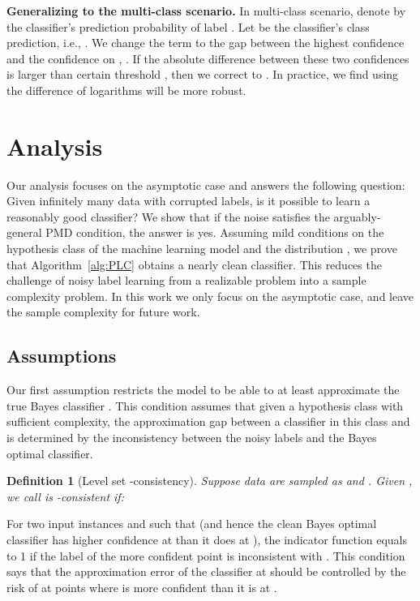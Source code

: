 \documentclass{article} \usepackage{iclr2021_conference,times}
\newtheorem{definition}{Definition}
\newcommand{\myparagraph}[1]{\textbf{#1}}
\begin{document}
\myparagraph{Generalizing to the multi-class scenario.} In multi-class scenario, denote by  the classifier's prediction probability of label . Let  be the classifier's class prediction, i.e., . 
We change the  term to the gap between the highest confidence  and the confidence on , . If the absolute difference between these two confidences is larger than certain threshold , then we correct  to . In practice, we find using the difference of logarithms will be more robust.

\section{Analysis}
\label{sec:theory}
\vspace{-0.5em}

Our analysis focuses on the asymptotic case and answers the following question: Given infinitely many data with corrupted labels, is it possible to learn a reasonably good classifier? We show that if the noise satisfies the arguably-general PMD condition, the answer is yes. Assuming mild conditions on the hypothesis class of the machine learning model and the distribution , we prove that Algorithm~\ref{alg:PLC} obtains a nearly clean classifier. This reduces the challenge of noisy label learning from a realizable problem into a sample complexity problem. In this work we only focus on the asymptotic case, and leave the sample complexity for future work.

\subsection{Assumptions}
\vspace{-0.5em}

Our first assumption restricts the model to be able to at least approximate the true Bayes classifier . This condition assumes that given a hypothesis class  with sufficient complexity, the approximation gap between a classifier  in this class and  is determined by the inconsistency between the noisy labels and the Bayes optimal classifier. 

\begin{definition} [Level set -consistency] \label{levelset_consist}
Suppose data are sampled as   and . Given , we call  is -consistent if:

\end{definition}

For two input instances  and  such that  (and hence the clean Bayes optimal classifier  has higher confidence at  than it does at ), the indicator function  equals to 1 if the label of the more confident point  is inconsistent with . This condition says that the approximation error of the classifier at  should be controlled by the risk of  at points  where  is more confident than it is at . 
\end{document}
